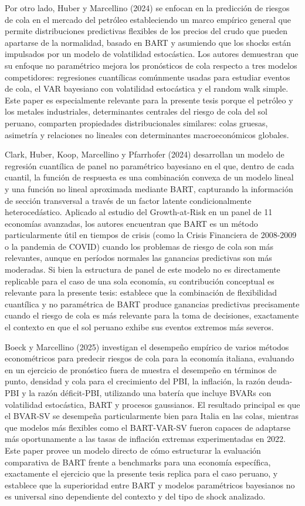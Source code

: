 ﻿\documentclass[11pt,a4paper]{article}
\begin{document}
Por otro lado, Huber y Marcellino (2024) se enfocan en la predicción de riesgos de cola en el mercado del petróleo estableciendo un marco empírico general que permite distribuciones predictivas flexibles de los precios del crudo que pueden apartarse de la normalidad, basado en BART y asumiendo que los shocks están impulsados por un modelo de volatilidad estocástica. Los autores demuestran que su enfoque no paramétrico mejora los pronósticos de cola respecto a tres modelos competidores: regresiones cuantílicas comúnmente usadas para estudiar eventos de cola, el VAR bayesiano con volatilidad estocástica y el random walk simple. Este paper es especialmente relevante para la presente tesis porque el petróleo y los metales industriales, determinantes centrales del riesgo de cola del sol peruano, comparten propiedades distribucionales similares: colas gruesas, asimetría y relaciones no lineales con determinantes macroeconómicos globales.


Clark, Huber, Koop, Marcellino y Pfarrhofer (2024) desarrollan un modelo de regresión cuantílica de panel no paramétrico bayesiano en el que, dentro de cada cuantil, la función de respuesta es una combinación convexa de un modelo lineal y una función no lineal aproximada mediante BART, capturando la información de sección transversal a través de un factor latente condicionalmente heterocedástico. Aplicado al estudio del Growth-at-Risk en un panel de 11 economías avanzadas, los autores encuentran que BART es un método particularmente útil en tiempos de crisis (como la Crisis Financiera de 2008-2009 o la pandemia de COVID) cuando los problemas de riesgo de cola son más relevantes, aunque en períodos normales las ganancias predictivas son más moderadas. Si bien la estructura de panel de este modelo no es directamente replicable para el caso de una sola economía, su contribución conceptual es relevante para la presente tesis: establece que la combinación de flexibilidad cuantílica y no paramétrica de BART produce ganancias predictivas precisamente cuando el riesgo de cola es más relevante para la toma de decisiones, exactamente el contexto en que el sol peruano exhibe sus eventos extremos más severos.


Boeck y Marcellino (2025) investigan el desempeño empírico de varios métodos econométricos para predecir riesgos de cola para la economía italiana, evaluando en un ejercicio de pronóstico fuera de muestra el desempeño en términos de punto, densidad y cola para el crecimiento del PBI, la inflación, la razón deuda-PBI y la razón déficit-PBI, utilizando una batería que incluye BVARs con volatilidad estocástica, BART y procesos gaussianos. El resultado principal es que el BVAR-SV se desempeña particularmente bien para Italia en las colas, mientras que modelos más flexibles como el BART-VAR-SV fueron capaces de adaptarse más oportunamente a las tasas de inflación extremas experimentadas en 2022. Este paper provee un modelo directo de cómo estructurar la evaluación comparativa de BART frente a benchmarks para una economía específica, exactamente el ejercicio que la presente tesis replica para el caso peruano, y establece que la superioridad entre BART y modelos paramétricos bayesianos no es universal sino dependiente del contexto y del tipo de shock analizado.
\end{document}

